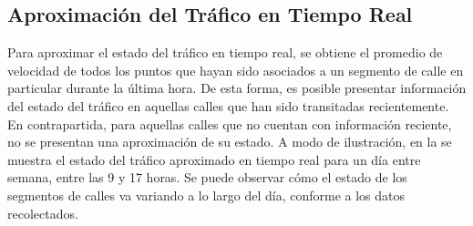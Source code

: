 \subsection{Aproximación del Tráfico en Tiempo Real}

Para aproximar el estado del tráfico en tiempo real, se obtiene el promedio de velocidad de todos los puntos que hayan sido asociados a un segmento de calle en particular durante la última hora. De esta forma, es posible presentar información del estado del tráfico en aquellas calles que han sido transitadas recientemente. En contrapartida, para aquellas calles que no cuentan con información reciente, no se presentan una aproximación de su estado. A modo de ilustración, en la  se muestra el estado del tráfico aproximado en tiempo real para un día entre semana, entre las 9 y 17 horas. Se puede observar cómo el estado de los segmentos de calles va variando a lo largo del día, conforme a los datos recolectados.

